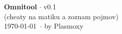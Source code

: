 \documentclass[10pt,a4paper]{article}
\begin{document}
	\begin{center}
		\Large{\textbf{Omnitool} $\cdot$ v0.1}\\
		(cheaty na matiku a zoznam pojmov)\\
		\today\ $\cdot$ by Plasmoxy
	\end{center}

	
	
\end{document}
